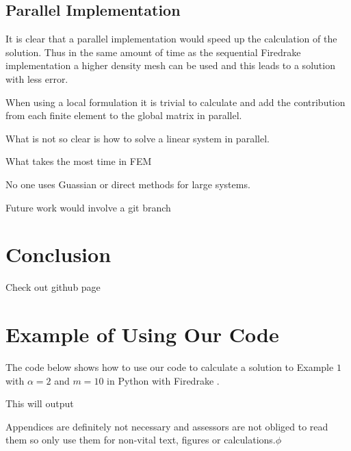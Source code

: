 \documentclass[12pt]{ociamthesis}
\begin{document}
\subsection{Parallel Implementation}
It is clear that a parallel implementation would speed up the calculation of the solution. Thus in the same amount of time as the sequential Firedrake implementation a higher density mesh can be used and this leads to a solution with less error.

When using a local formulation it is trivial to calculate and add the contribution from each finite element to the global matrix in parallel.

What is not so clear is how to solve a linear system in parallel. 

What takes the most time in FEM

No one uses Guassian or direct methods for large systems.

Future work would involve a git branch 

\section{Conclusion}
Check out github page \cite{Hub}

\printbibliography[heading=bibintoc]

\appendix

\section{Example of Using Our Code}
The code below shows how to use our code to calculate a solution to Example $1$ with $\alpha=2$ and $m=10$ in Python with Firedrake \cite{Dragon}.

This will output 



Appendices are definitely not necessary and assessors are not obliged to read them so only use them for non-vital text, figures or calculations.$\phi$
\end{document}
